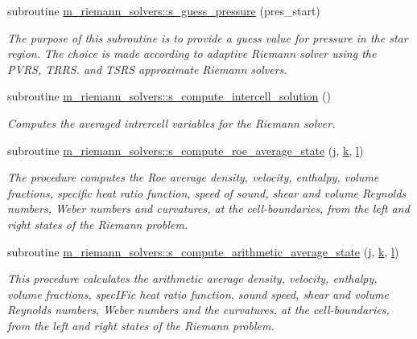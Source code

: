 \begin{DoxyCompactItemize}
subroutine \hyperlink{namespacem__riemann__solvers_a7e533d9eadb12af316d72f1b722735d8}{m\+\_\+riemann\+\_\+solvers\+::s\+\_\+guess\+\_\+pressure} (pres\+\_\+start)
\begin{DoxyCompactList}\small\item\em The purpose of this subroutine is to provide a guess value for pressure in the star region. The choice is made according to adaptive Riemann solver using the P\+V\+RS, T\+R\+RS. and T\+S\+RS approximate Riemann solvers. \end{DoxyCompactList}\item 
subroutine \hyperlink{namespacem__riemann__solvers_a68651027acd974568fd5f94ed39c8e82}{m\+\_\+riemann\+\_\+solvers\+::s\+\_\+compute\+\_\+intercell\+\_\+solution} ()
\begin{DoxyCompactList}\small\item\em Computes the averaged intrercell variables for the Riemann solver. \end{DoxyCompactList}\item 
subroutine \hyperlink{namespacem__riemann__solvers_aeeea1cc689aa550f3c1f182fe33a4939}{m\+\_\+riemann\+\_\+solvers\+::s\+\_\+compute\+\_\+roe\+\_\+average\+\_\+state} (\hyperlink{m__rhs_8f90_aeadbc0ce9b66517f8fde156199772ec1}{j}, \hyperlink{m__rhs_8f90_af22c486581933c52df7d4aa306382074}{k}, \hyperlink{m__rhs_8f90_a2ac747380de0e6e5e11b01f4137fb75c}{l})
\begin{DoxyCompactList}\small\item\em The procedure computes the Roe average density, velocity, enthalpy, volume fractions, specific heat ratio function, speed of sound, shear and volume Reynolds numbers, Weber numbers and curvatures, at the cell-\/boundaries, from the left and right states of the Riemann problem. \end{DoxyCompactList}\item 
subroutine \hyperlink{namespacem__riemann__solvers_a14b6f4fa2f3b1d567a3f3347105ce61e}{m\+\_\+riemann\+\_\+solvers\+::s\+\_\+compute\+\_\+arithmetic\+\_\+average\+\_\+state} (\hyperlink{m__rhs_8f90_aeadbc0ce9b66517f8fde156199772ec1}{j}, \hyperlink{m__rhs_8f90_af22c486581933c52df7d4aa306382074}{k}, \hyperlink{m__rhs_8f90_a2ac747380de0e6e5e11b01f4137fb75c}{l})
\begin{DoxyCompactList}\small\item\em This procedure calculates the arithmetic average density, velocity, enthalpy, volume fractions, spec\+I\+Fic heat ratio function, sound speed, shear and volume Reynolds numbers, Weber numbers and the curvatures, at the cell-\/boundaries, from the left and right states of the Riemann problem. \end{DoxyCompactList}\item 

\end{DoxyCompactItemize}
